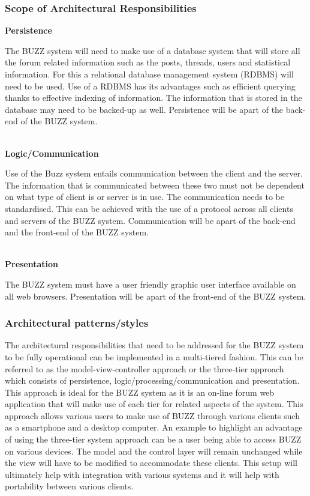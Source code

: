 \documentclass[a4paper,12pt]{article}
\begin{document}
\subsubsection{Scope of Architectural Responsibilities}

\textbf{Persistence}
\begin{flushleft}
The BUZZ system will need to make use of a database system that will store all the forum related information such as the posts, threads, users and statistical information. For this a relational database management system (RDBMS) will need to be used. Use of a RDBMS has its advantages such as efficient querying thanks to effective indexing of information. The information that is stored in the database may need to be backed-up as well. Persistence will be apart of the back-end of the BUZZ system.
\end{flushleft}
\\
\textbf{Logic/Communication}
\begin{flushleft}
Use of the Buzz system entails communication between the client and the server. The information that is communicated between these two must not be dependent on what type of client is or server is in use. The communication needs to be standardised. This can be achieved with the use of a protocol across all clients and servers of the BUZZ system. Communication will be apart of the back-end and the front-end of the BUZZ system.
\end{flushleft}
\\
\textbf{Presentation}
\begin{flushleft}
The BUZZ system must have a user friendly graphic user interface available on all web browsers. Presentation will be apart of the front-end of the BUZZ system.
\end{flushleft}

\subsubsection{Architectural patterns/styles}
The architectural responsibilities that need to be addressed for the BUZZ system to be fully operational can be implemented in a multi-tiered fashion. This can be referred to as the model-view-controller approach or the three-tier approach which consists of persistence, logic/processing/communication and presentation. This approach is ideal for the BUZZ system as it is an on-line forum web application that will make use of each tier for related aspects of the system. This approach allows various users to make use of BUZZ through various clients such as a smartphone and a desktop computer. An example to highlight an advantage of using the three-tier system approach can be a user being able to access BUZZ on various devices. The model and the control layer will remain unchanged while the view will have to be modified to accommodate these clients.  This setup will ultimately help with integration with various systems and it will help with portability between various clients. 
\end{document}
